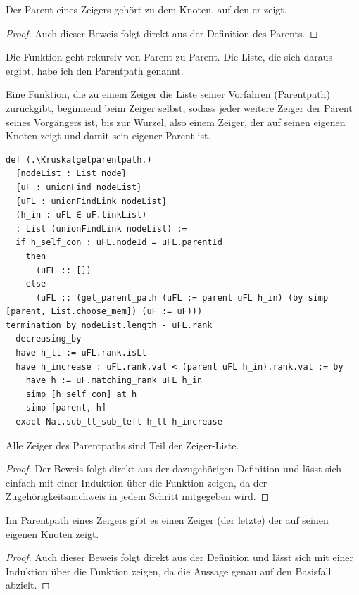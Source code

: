 \begin{lemma}[\KruskalparentnodeId]
  Der Parent eines Zeigers gehört zu dem Knoten, auf den er zeigt.
\end{lemma}
\begin{proof}
  Auch dieser Beweis folgt direkt aus der Definition des Parents.
\end{proof}

Die Funktion \KruskalconnectedcomponentofunionFindofunionFindLink geht rekursiv von Parent zu Parent.
Die Liste, die sich daraus ergibt, habe ich den Parentpath genannt.

\begin{definition}[\Kruskalgetparentpath]
  Eine Funktion, die zu einem Zeiger die Liste seiner Vorfahren (Parentpath) zurückgibt, beginnend beim Zeiger selbst, sodass jeder weitere Zeiger der Parent seines Vorgängers ist,
  bis zur Wurzel, also einem Zeiger, der auf seinen eigenen Knoten zeigt und damit sein eigener Parent ist.
\end{definition}
\newpage
\begin{lstlisting}
def (.\Kruskalgetparentpath.)
  {nodeList : List node}
  {uF : unionFind nodeList}
  {uFL : unionFindLink nodeList}
  (h_in : uFL ∈ uF.linkList)
  : List (unionFindLink nodeList) :=
  if h_self_con : uFL.nodeId = uFL.parentId
    then
      (uFL :: [])
    else
      (uFL :: (get_parent_path (uFL := parent uFL h_in) (by simp [parent, List.choose_mem]) (uF := uF)))
termination_by nodeList.length - uFL.rank
  decreasing_by
  have h_lt := uFL.rank.isLt
  have h_increase : uFL.rank.val < (parent uFL h_in).rank.val := by
    have h := uF.matching_rank uFL h_in
    simp [h_self_con] at h
    simp [parent, h]
  exact Nat.sub_lt_sub_left h_lt h_increase
\end{lstlisting}



\begin{lemma}[\Kruskalgetparentpathin]
  Alle Zeiger des Parentpaths sind Teil der Zeiger-Liste.
\end{lemma}
\begin{proof}
  Der Beweis folgt direkt aus der dazugehörigen Definition und lässt sich einfach mit einer Induktion über die Funktion \Kruskalgetparentpath zeigen,
  da der Zugehörigkeitsnachweis in jedem Schritt mitgegeben wird.
\end{proof}



\begin{lemma}[\Kruskalgetparentpathend]
  Im Parentpath eines Zeigers gibt es einen Zeiger (der letzte) der auf seinen eigenen Knoten zeigt.
\end{lemma}
\begin{proof}
  Auch dieser Beweis folgt direkt aus der Definition und lässt sich mit einer Induktion über die Funktion zeigen, da die Aussage genau auf den Basisfall abzielt.
\end{proof}



